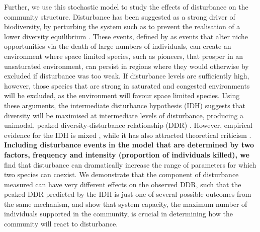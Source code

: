 Further, we use this stochastic model to study the effects of disturbance on the community structure. Disturbance has been suggested as a strong driver of biodiversity, by perturbing the system such as to prevent the realisation of a lower diversity equilibrium \citep[e.g.][]{denslow1987tropical,sousa1984role}. These events, defined by \cite{shea2004moving} as events that alter niche opportunities via the death of large numbers of individuals, can create an environment where space limited species, such as pioneers, that prosper in an unsaturated environment, can persist in regions where they would otherwise by excluded if disturbance was too weak. If disturbance levels are sufficiently high, however, those species that are strong in saturated and congested environments will be excluded, as the environment will favour space limited species. Using these arguments, the intermediate disturbance hypothesis (IDH) suggests that diversity will be maximised at intermediate levels of disturbance, producing a unimodal, peaked diversity-disturbance relationship (DDR) \citep[e.g.][]{connell1978diversity,grime1973competitive,huston1979general}. However, empirical evidence for the IDH is mixed \citep[see review in ][]{mackey2001diversity}, while it has also attracted theoretical criticism \citep[e.g.][]{fox2012intermediate}. \textbf{Including disturbance events in the model that are determined by two factors, frequency and intensity (proportion of individuals killed), we} find that disturbance can dramatically increase the range of parameters for which two species can coexist. We demonstrate that the component of disturbance measured can have very different effects on the observed DDR, such that the peaked DDR predicted by the IDH is just one of several possible outcomes from the same mechanism, and show that system capacity, the maximum number of individuals supported in the community, is crucial in determining how the community will react to disturbance.

